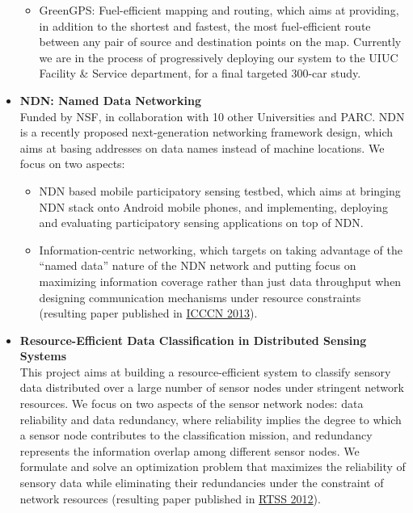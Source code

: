 \begin{itemize}
\begin{itemize}
		\item GreenGPS: Fuel-efficient mapping and routing, which aims at providing, in addition to the shortest and fastest, the most fuel-efficient route between any pair of source and destination points on the map. Currently we are in the process of progressively deploying our system to the UIUC Facility \& Service department, for a final targeted 300-car study.
	\end{itemize}
	
	\item \textbf{NDN: Named Data Networking} \\
	Funded by NSF, in collaboration with 10 other Universities and PARC. NDN is a recently proposed next-generation networking framework design, which aims at basing addresses on data names instead of machine locations. We focus on two aspects: 
	\begin{itemize}
		\item NDN based mobile participatory sensing testbed, which aims at bringing NDN stack onto Android mobile phones, and implementing, deploying and evaluating participatory sensing applications on top of NDN. 
		\item Information-centric networking, which targets on taking advantage of the ``named data'' nature of the NDN network and putting focus on maximizing information coverage rather than just data throughput when designing communication mechanisms under resource constraints (resulting paper published in \hyperlink{wang2013icccn}{\textsc{ICCCN 2013}}).
	\end{itemize}
	
	\item \textbf{Resource-Efficient Data Classification in Distributed Sensing Systems} \\
	This project aims at building a resource-efficient system to classify sensory data distributed over a large number of sensor nodes under stringent network resources. We focus on two aspects of the sensor network nodes: data reliability and data redundancy, where reliability implies the degree to which a sensor node contributes to the classification mission, and redundancy represents the information overlap among different sensor nodes. We formulate and solve an optimization problem that maximizes the reliability of sensory data while eliminating their redundancies under the constraint of network resources (resulting paper published in \hyperlink{su2012rtss}{\textsc{RTSS 2012}}).
\end{itemize}

